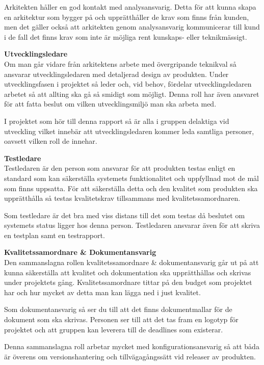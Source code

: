\documentclass[a4paper,10pt]{article}
\begin{document}
Arkitekten håller en god kontakt med analysansvarig. Detta för att kunna skapa en arkitektur som bygger på och upprätthåller de krav som finns från kunden, men det gäller också att arkitekten genom analysansvarig kommunicerar till kund i de fall det finns krav som inte är möjliga rent kunskaps- eller teknikmässigt.

\textbf{Utvecklingsledare}\\
Om man går vidare från arkitektens arbete med övergripande teknikval så ansvarar utvecklingsledaren med detaljerad design av produkten. Under utvecklingsfasen i projektet så leder och, vid behov, fördelar utvecklingsledaren arbetet så att allting ska gå så smidigt som möjligt. Denna roll har även ansvaret för att fatta beslut om vilken utvecklingsmiljö man ska arbeta med.

I projektet som hör till denna rapport så är alla i gruppen delaktiga vid utveckling vilket innebär att utvecklingsledaren kommer leda samtliga personer, oavsett vilken roll de innehar.

\textbf{Testledare}\\
Testledaren är den person som ansvarar för att produkten testas enligt en standard som kan säkerställa systemets funktionalitet och uppfyllnad mot de mål som finns uppsatta. För att säkerställa detta och den kvalitet som produkten ska upprätthålla så testas kvalitetskrav tillsammans med kvalitetssamordnaren.

Som testledare är det bra med viss distans till det som testas då beslutet om systemets status ligger hos denna person. Testledaren ansvarar även för att skriva en testplan samt en testrapport.

\textbf{Kvalitetssamordnare \& Dokumentansvarig}\\
Den sammanslagna rollen kvalitetssamordnare \& dokumentansvarig går ut på att kunna säkerställa att kvalitet och dokumentation ska upprätthållas och skrivas under projektets gång. Kvalitetssamordnare tittar på den budget som projektet har och hur mycket av detta man kan lägga ned i just kvalitet.

Som dokumentansvarig så ser du till att det finns dokumentmallar för de dokument som ska skrivas. Personen ser till att det tas fram en logotyp för projektet och att gruppen kan leverera till de deadlines som existerar.

Denna sammanslagna roll arbetar mycket med konfigurationsansvarig så att båda är överens om versionshantering och tillvägagångssätt vid releaser av produkten.
\end{document}
